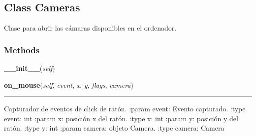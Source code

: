 \subsection{Class Cameras}

    \label{src:cameras:Cameras}

Clase para abrir las cámaras disponibles en el ordenador.


  \subsubsection{Methods}

    \label{src:cameras:Cameras:__init__}

    \vspace{0.5ex}

\hspace{.8\funcindent}\begin{boxedminipage}{\funcwidth}

    \raggedright \textbf{\_\_init\_\_}(\textit{self})

\setlength{\parskip}{2ex}
\setlength{\parskip}{1ex}
    \end{boxedminipage}

    \label{src:cameras:Cameras:on_mouse}

    \vspace{0.5ex}

\hspace{.8\funcindent}\begin{boxedminipage}{\funcwidth}

    \raggedright \textbf{on\_mouse}(\textit{self}, \textit{event}, \textit{x}, \textit{y}, \textit{flags}, \textit{camera})

    \vspace{-1.5ex}

    \rule{\textwidth}{0.5\fboxrule}
\setlength{\parskip}{2ex}

Capturador de eventos de click de ratón.
:param event: Evento capturado.
:type event: int
:param x: posición x del ratón.
:type x: int
:param y: posición y del ratón.
:type y: int
:param camera: objeto Camera.
:type camera: Camera
\setlength{\parskip}{1ex}
    \end{boxedminipage}

